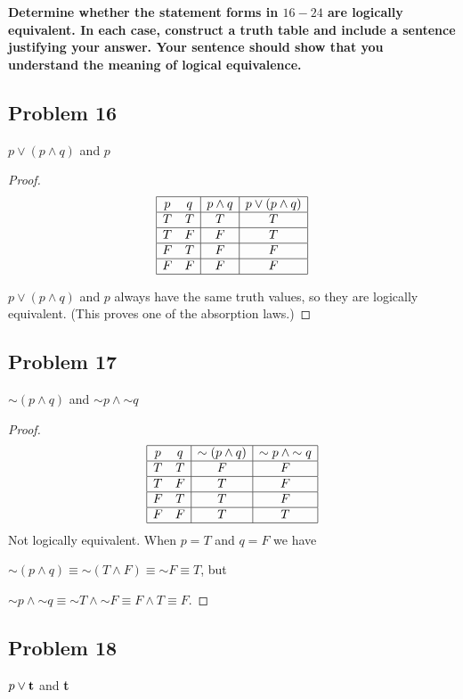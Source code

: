 \documentclass[14pt]{extarticle}
\newcommand{\true}{{\bf t}}
\begin{document}
{\bf Determine whether the statement forms in $16-24$ are logically equivalent. In each case, construct a truth table and include a sentence justifying your answer. Your sentence should show that you understand the meaning of logical equivalence.}

\subsection{Problem 16}
$p \vee (p \wedge q)$ and $p$

\begin{proof}
$$
\begin{array}{|cc|c|c|}
\hline
p & q & p \wedge q & p \vee (p \wedge q) \\
\hline
T & T & T & T \\
\hline
T & F & F & T \\
\hline
F & T & F & F \\
\hline
F & F & F & F \\
\hline
\end{array}
$$

$p \vee (p \wedge q)$ and $p$ always have the same truth values, so they are logically equivalent. (This proves one of the absorption laws.)
\end{proof}

\subsection{Problem 17}
${\sim(p \wedge q)}$ and ${\sim p} \wedge {\sim q}$

\begin{proof}
$$
\begin{array}{|cc|c|c|}
\hline
p & q & {\sim(p \wedge q)} & {\sim p} \wedge {\sim q} \\
\hline
T & T & F & F \\
\hline
T & F & T & F \\
\hline
F & T & T & F \\
\hline
F & F & T & T \\
\hline
\end{array}
$$
Not logically equivalent. When $p = T$ and $q = F$ we have

${\sim (p \wedge q)} \equiv {\sim (T \wedge F)} \equiv {\sim F} \equiv T$, but

${\sim p} \wedge {\sim q} \equiv {\sim T \wedge {\sim F}} \equiv
F \wedge T \equiv F$.
\end{proof}

\subsection{Problem 18}
$p \vee \true$ and \true
\end{document}
